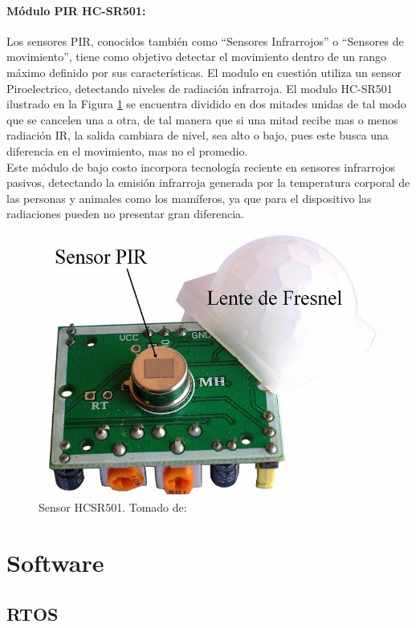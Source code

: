 \paragraph{Módulo PIR HC-SR501: }

Los sensores PIR, conocidos también como ``Sensores Infrarrojos'' o ``Sensores de movimiento'', tiene como objetivo detectar el movimiento dentro de un rango máximo definido por sus características. El modulo en cuestión utiliza un sensor Piroelectrico, detectando niveles de radiación infrarroja. El modulo HC-SR501 ilustrado en la Figura \ref{fig:sensor-hc-sr501-1000-m} se encuentra dividido en dos mitades unidas de tal modo que se cancelen una a otra, de tal manera que si una mitad recibe mas o menos radiación IR, la salida cambiara de nivel, sea alto o bajo, pues este busca una diferencia en el movimiento, mas no el promedio. \cite{PIR1}\\

Este módulo de bajo costo incorpora tecnología reciente en sensores infrarrojos pasivos, detectando la emisión infrarroja generada por la temperatura corporal de las personas y animales como los mamíferos, ya que para el dispositivo las radiaciones pueden no presentar gran diferencia. \cite{PIR2}\\


\begin{figure}[H]
	\centering
	\caption[Sensor HCSR501.]{Sensor HCSR501. Tomado de: \cite{PIR2}}
	\label{fig:sensor-hc-sr501-1000-m}
	\includegraphics[width=0.5\linewidth]{Imagenes/SENSOR-HC-SR501-1000-M}
\end{figure}

\section{Software}

\subsection{RTOS}

